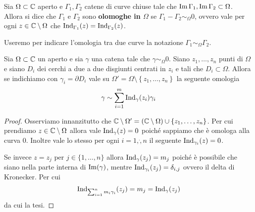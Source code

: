 \begin{definition}
  \label{def:omologia-tra-catene}
  Sia $\Omega \subset \mathbb{C}$ aperto e $\Gamma_1,\Gamma_2$ catene di curve 
  chiuse tale che $\operatorname{Im}{\Gamma_1}, \operatorname{Im}{\Gamma_2} \subset \Omega$. 
  Allora si dice che $\Gamma_1$ e $\Gamma_2$ sono \textbf{olomoghe in 
  $\Omega$} se $\Gamma_1 - \Gamma_2 \sim_\Omega 0$, ovvero vale per ogni $z
  \in \mathbb{C} \setminus \Omega$ che $\operatorname{Ind}_{\Gamma_1}(z)
  = \operatorname{Ind}_{\Gamma_2}(z)$.
\end{definition}

\begin{remark}
  Useremo per indicare l'omologia tra due curve la notazione
  $\Gamma_1 \sim_\Omega \Gamma_2$.
  \label{rmk:notazione-omologia-catene}
\end{remark}

\begin{proposition}
    \label{prop:decomposizione-curva-in-catena-con-n-punti}
    Sia $\Omega \subset \mathbb{C}$ un aperto e sia $\gamma$ una catena tale che
    $\gamma \sim_\Omega 0$. Siano $z_1, \dots, z_n$ punti di $\Omega$
    e siano $D_i$ dei cerchi a due a due disgiunti centrati in $z_i$ e tali
    che $D_i \subset \Omega$. Allora se indichiamo con $\gamma_i = \partial
    D_i$ vale su $\Omega' = \Omega \setminus \left\{z_1,\dots, z_n\right\}$ la
    seguente omologia
    \begin{equation*}
      \gamma \sim \sum^m_{i=1} \operatorname{Ind}_\gamma(z_i) \gamma_i
    \end{equation*}
\end{proposition}
\begin{proof}
     Osserviamo innanzitutto che $\mathbb{C} \setminus \Omega' = (\mathbb{C} \setminus
     \Omega) \cup \{z_1, \dots, z_n\}$. Per cui prendiamo $z\in \mathbb{C} \setminus
     \Omega$ allora vale $\operatorname{Ind}_\gamma(z) = 0$ poiché sappiamo
     che è omologa alla curva $0$. Inoltre vale lo stesso per ogni $i
     = 1,\dot, n$ il seguente $\operatorname{Ind}_{\gamma_i}(z) = 0$. 

     Se invece $z = z_j$ per $j \in \{1, \dots, n\}$ allora
     $\operatorname{Ind}_\gamma(z_j) = m_j$ poiché è possibile che siano 
     nella parte interna di $\operatorname{Im}(\gamma)$, mentre
     $\operatorname{Ind}_{\gamma_i}(z_j) = \delta_{i,j}$ ovvero il delta di
     Kronecker. Per cui 
     \begin{equation*}
       \operatorname{Ind}_{\sum^n_{i=1} m_i \gamma_i}(z_j) = m_j
       = \operatorname{Ind}_\gamma(z_j) 
     \end{equation*}
    da cui la tesi.
 \end{proof}

